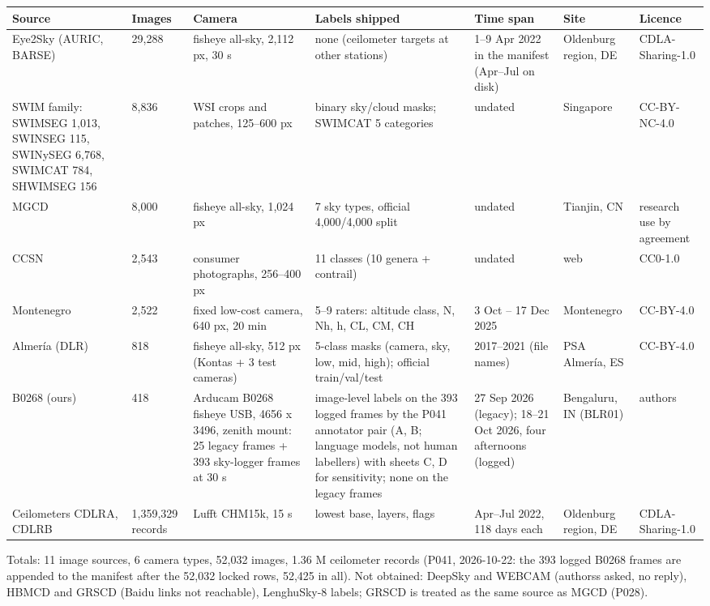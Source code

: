 \begin{center}{\scriptsize\setlength{\tabcolsep}{3pt}
\begin{tabular}{p{2.2cm}lp{2.5cm}p{2.5cm}p{1.7cm}ll}
\toprule
Source & Images & Camera & Labels shipped & Time span & Site & Licence \\
\midrule
Eye2Sky (AURIC, BARSE) & 29,288 & fisheye all-sky, 2,112 px, 30 s & none (ceilometer targets at other stations) & 1–9 Apr 2022 in the manifest (Apr–Jul on disk) & Oldenburg region, DE & CDLA-Sharing-1.0 \\
SWIM family: SWIMSEG 1,013, SWINSEG 115, SWINySEG 6,768, SWIMCAT 784, SHWIMSEG 156 & 8,836 & WSI crops and patches, 125–600 px & binary sky/cloud masks; SWIMCAT 5 categories & undated & Singapore & CC-BY-NC-4.0 \\
MGCD & 8,000 & fisheye all-sky, 1,024 px & 7 sky types, official 4,000/4,000 split & undated & Tianjin, CN & research use by agreement \\
CCSN & 2,543 & consumer photographs, 256–400 px & 11 classes (10 genera + contrail) & undated & web & CC0-1.0 \\
Montenegro & 2,522 & fixed low-cost camera, 640 px, 20 min & 5–9 raters: altitude class, N, Nh, h, CL, CM, CH & 3 Oct – 17 Dec 2025 & Montenegro & CC-BY-4.0 \\
Almería (DLR) & 818 & fisheye all-sky, 512 px (Kontas + 3 test cameras) & 5-class masks (camera, sky, low, mid, high); official train/val/test & 2017–2021 (file names) & PSA Almería, ES & CC-BY-4.0 \\
B0268 (ours) & 418 & Arducam B0268 fisheye USB, 4656 x 3496, zenith mount: 25 legacy frames + 393 sky-logger frames at 30 s & image-level labels on the 393 logged frames by the P041 annotator pair (A, B; language models, not human labellers) with sheets C, D for sensitivity; none on the legacy frames & 27 Sep 2026 (legacy); 18–21 Oct 2026, four afternoons (logged) & Bengaluru, IN (BLR01) & authors \\
Ceilometers CDLRA, CDLRB & 1,359,329 records & Lufft CHM15k, 15 s & lowest base, layers, flags & Apr–Jul 2022, 118 days each & Oldenburg region, DE & CDLA-Sharing-1.0 \\
\bottomrule
\end{tabular}}
\end{center}

Totals: 11 image sources, 6 camera types, 52,032 images, 1.36 M ceilometer records (P041, 2026-10-22: the 393 logged B0268 frames are appended to the manifest after the 52,032 locked rows, 52,425 in all). Not obtained: DeepSky and WEBCAM (authorss asked, no reply), HBMCD and GRSCD (Baidu links not reachable), LenghuSky-8 labels; GRSCD is treated as the same source as MGCD (P028).

